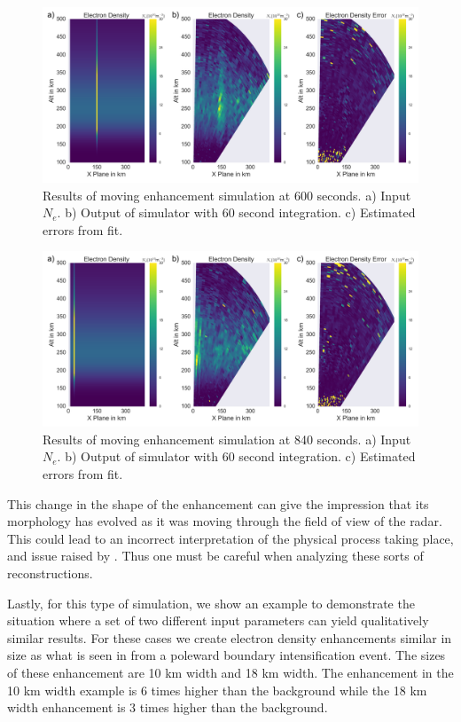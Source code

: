 \documentclass[draft,ras]{agutex}
\begin{document}
\begin{article}
\begin{figure}[!t]
\centering
\includegraphics[width=6in]{moving6mins}
\caption{Results of moving enhancement simulation at 600 seconds. a) Input $N_e$. b) Output of simulator with 60 second integration. c) Estimated errors from fit.}
\label{fig:moving10mins}
\end{figure}


\begin{figure}[!t]
\centering
\includegraphics[width=6in]{moving14mins}
\caption{Results of moving enhancement simulation at 840 seconds. a) Input $N_e$. b) Output of simulator with 60 second integration. c) Estimated errors from fit.}
\label{fig:moving14mins}
\end{figure}

This change in the shape of the enhancement can give the impression that its morphology has evolved as it was moving through the field of view of the radar. This could lead to an incorrect interpretation of the physical process taking place, and issue raised by \citet{Dahlgren:2012dq}.   Thus one must be careful when analyzing these sorts of reconstructions.

Lastly, for this type of simulation, we show an example to demonstrate the situation where a set of two different input parameters can yield qualitatively similar results. For these cases we create electron density enhancements similar in size as what is seen in \citet{Semeter:2005fo} from a poleward boundary intensification event. The sizes of these enhancement are 10 km width and 18 km width. The enhancement in the 10 km width example is 6 times higher than the background while the 18 km width enhancement is 3 times higher than the background.


\end{article}
\end{document}
